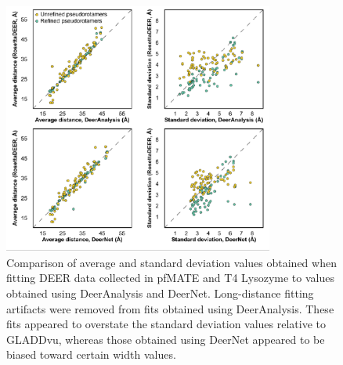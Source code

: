 \begin{figure}[h]
\centering
\includegraphics[width=3.5in]{Figures/multilateration_supp_avgs_stdevs.pdf}
\caption[Comparison of average and standard deviation values obtained when fitting DEER data collected in pfMATE and T4 Lysozyme to values obtained using DeerAnalysis and DeerNet.]{Comparison of average and standard deviation values obtained when fitting DEER data collected in pfMATE and T4 Lysozyme to values obtained using DeerAnalysis and DeerNet. Long-distance fitting artifacts were removed from fits obtained using DeerAnalysis. These fits appeared to overstate the standard deviation values relative to GLADDvu, whereas those obtained using DeerNet appeared to be biased toward certain width values.}
\label{fig:multilateration_supp_avgs_stdev}
\end{figure}

